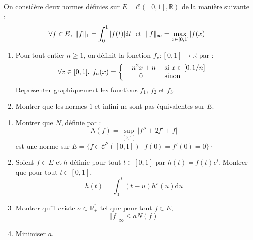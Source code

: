\documentclass[a4paper,twoside,french,11pt]{VcCours}
\newcommand{\dt}{\text{d}t}
\begin{document}
\begin{Exercice}{} On considère deux normes définies sur $E= \mathcal{C}([0,1], \mathbb{R})$ de la manière suivante :
$$ \forall f \in E, \; \Vert f \Vert_1 = \int_0^1 \vert f(t) \vert \dt \; \hbox{ et } \; \Vert f \Vert_{\infty} = \max_{x \in [0,1]} \vert f(x) \vert$$
\begin{enumerate}
\item Pour tout entier $n \geq 1$, on définit la fonction $f_n : [0,1] \rightarrow \mathbb{R}$ par :
$$ \forall x \in [0,1], \; f_n(x) = \left\lbrace \begin{array}{cl}
-n^2x+n & \hbox{ si } x \in [0,1/n] \\
0 & \hbox{ sinon}
\end{array}\right.$$
Représenter graphiquement les fonctions $f_1$, $f_2$ et $f_3$.
\item Montrer que les normes $1$ et infini ne sont pas équivalentes sur $E$.
\end{enumerate}
\end{Exercice}

\begin{Exercice}[$\bigstar$]
\begin{enumerate}
\item Montrer que $N$, définie par :
$$ N(f) = \sup_{[0,1]} \vert f''+2f'+f \vert $$
est une norme sur $E = \lbrace f \in \mathcal{C}^2([0,1]) \, \vert \, f(0)=f'(0)=0 \rbrace \cdot$
\item Soient $f \in E$ et $h$ définie pour tout $t \in [0,1]$ par $h(t)=f(t)e^t$. Montrer que pour tout $t \in [0,1]$,
$$ h(t) = \int_{0}^t (t-u) h''(u) \textrm{d}u$$
\item Montrer qu'il existe $a \in \mathbb{R}_+^{*}$ tel que pour tout $f \in E$,
$$ \Vert f \Vert_{\infty} \leq a N(f)$$
\item Minimiser $a$.
\end{enumerate}
\end{Exercice}
\end{document}
